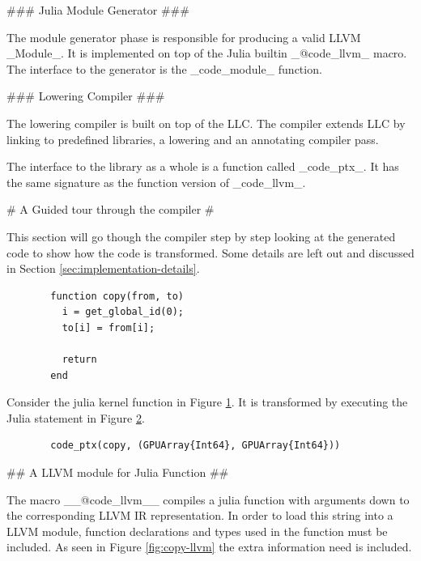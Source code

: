 \begin{markdown}
### Julia Module Generator ###

The module generator phase is responsible for producing a valid LLVM
_Module_. It is implemented on top of the Julia builtin _@code_llvm_
macro. The interface to the generator is the _code_module_ function.

### Lowering Compiler ###

The lowering compiler is built on top of the \gls{LLC}. The compiler
extends \gls{LLC} by linking to predefined libraries, a lowering and
an annotating compiler pass.

The interface to the library as a whole is a function called
_code_ptx_. It has the same signature as the function version of
_code_llvm_.

# A Guided tour through the compiler #

This section will go though the compiler step by step looking at the
generated code to show how the code is transformed. Some details are
left out and discussed in Section \ref{sec:implementation-details}.


\begin{figure}[H]
  \begin{verbatim}
  function copy(from, to)
    i = get_global_id(0);
    to[i] = from[i];
  
    return
  end
  \end{verbatim}
  \caption{}
  \label{fig:julia-copy}
\end{figure}

Consider the julia kernel function in Figure \ref{fig:julia-copy}. It
is transformed by executing the Julia statement in Figure
\ref{fig:impl:code_ptx}.

\begin{figure}[H]
  \begin{verbatim}
  code_ptx(copy, (GPUArray{Int64}, GPUArray{Int64}))
  \end{verbatim}
  \caption{}
  \label{fig:impl:code_ptx}
\end{figure}


## A LLVM module for Julia Function ##

The macro __@code\_llvm__ compiles a julia function with arguments
down to the corresponding LLVM IR representation. In order to load
this string into a LLVM module, function declarations and types used
in the function must be included. As seen in Figure
\ref{fig:copy-llvm} the extra information need is included. 


\end{markdown}
